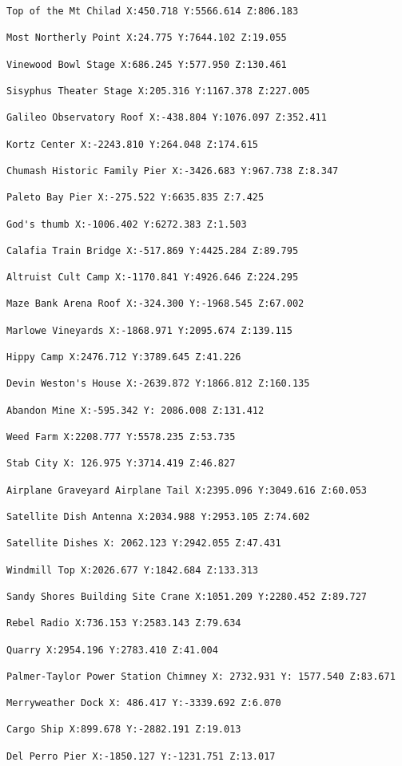 \documentclass[
  openany]{book}
\begin{document}
\begin{verbatim}
Top of the Mt Chilad X:450.718 Y:5566.614 Z:806.183

Most Northerly Point X:24.775 Y:7644.102 Z:19.055

Vinewood Bowl Stage X:686.245 Y:577.950 Z:130.461

Sisyphus Theater Stage X:205.316 Y:1167.378 Z:227.005

Galileo Observatory Roof X:-438.804 Y:1076.097 Z:352.411

Kortz Center X:-2243.810 Y:264.048 Z:174.615

Chumash Historic Family Pier X:-3426.683 Y:967.738 Z:8.347

Paleto Bay Pier X:-275.522 Y:6635.835 Z:7.425

God's thumb X:-1006.402 Y:6272.383 Z:1.503

Calafia Train Bridge X:-517.869 Y:4425.284 Z:89.795

Altruist Cult Camp X:-1170.841 Y:4926.646 Z:224.295

Maze Bank Arena Roof X:-324.300 Y:-1968.545 Z:67.002

Marlowe Vineyards X:-1868.971 Y:2095.674 Z:139.115

Hippy Camp X:2476.712 Y:3789.645 Z:41.226

Devin Weston's House X:-2639.872 Y:1866.812 Z:160.135

Abandon Mine X:-595.342 Y: 2086.008 Z:131.412

Weed Farm X:2208.777 Y:5578.235 Z:53.735

Stab City X: 126.975 Y:3714.419 Z:46.827

Airplane Graveyard Airplane Tail X:2395.096 Y:3049.616 Z:60.053

Satellite Dish Antenna X:2034.988 Y:2953.105 Z:74.602

Satellite Dishes X: 2062.123 Y:2942.055 Z:47.431

Windmill Top X:2026.677 Y:1842.684 Z:133.313

Sandy Shores Building Site Crane X:1051.209 Y:2280.452 Z:89.727

Rebel Radio X:736.153 Y:2583.143 Z:79.634

Quarry X:2954.196 Y:2783.410 Z:41.004

Palmer-Taylor Power Station Chimney X: 2732.931 Y: 1577.540 Z:83.671

Merryweather Dock X: 486.417 Y:-3339.692 Z:6.070

Cargo Ship X:899.678 Y:-2882.191 Z:19.013

Del Perro Pier X:-1850.127 Y:-1231.751 Z:13.017


\end{verbatim}
\end{document}
